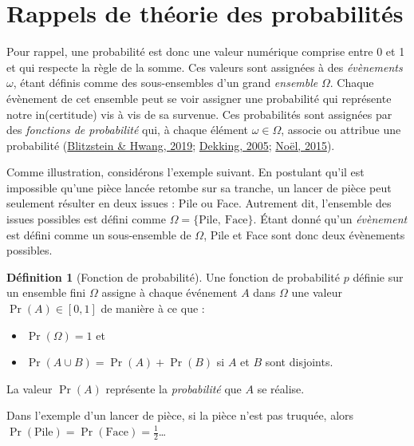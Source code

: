 \documentclass[
  a4paper,11pt,twoside,onecolumn,openright,final,oldfontcommands]{memoir}
\providecommand{\tightlist}{%
  \setlength{\itemsep}{0pt}\setlength{\parskip}{0pt}}
\theoremstyle{definition}
\newtheorem{definition}{Définition}[chapter]
\theoremstyle{definition}
\theoremstyle{definition}
\theoremstyle{definition}
\theoremstyle{remark}
\begin{document}
\hypertarget{rappels-de-thuxe9orie-des-probabilituxe9s}{%
\section{Rappels de théorie des probabilités}\label{rappels-de-thuxe9orie-des-probabilituxe9s}}

Pour rappel, une probabilité est donc une valeur numérique comprise entre 0 et 1 et qui respecte la règle de la somme. Ces valeurs sont assignées à des \emph{évènements} \(\omega\), étant définis comme des sous-ensembles d'un grand \emph{ensemble} \(\Omega\). Chaque évènement de cet ensemble peut se voir assigner une probabilité qui représente notre in(certitude) vis à vis de sa survenue. Ces probabilités sont assignées par des \emph{fonctions de probabilité} qui, à chaque élément \(\omega \in \Omega\), associe ou attribue une probabilité (\protect\hyperlink{ref-blitzstein_introduction_2019}{Blitzstein \& Hwang, 2019}; \protect\hyperlink{ref-dekking_modern_2005}{Dekking, 2005}; \protect\hyperlink{ref-noel_psychologie_2015}{Noël, 2015}).

Comme illustration, considérons l'exemple suivant. En postulant qu'il est impossible qu'une pièce lancée retombe sur sa tranche, un lancer de pièce peut seulement résulter en deux issues : Pile ou Face. Autrement dit, l'ensemble des issues possibles est défini comme \(\Omega = \{\text{Pile}, \ \text{Face}\}\). Étant donné qu'un \emph{évènement} est défini comme un sous-ensemble de \(\Omega\), Pile et Face sont donc deux évènements possibles.

\begin{definition}[Fonction de probabilité]
\protect\hypertarget{def:prob-function}{}\label{def:prob-function}Une fonction de probabilité \(p\) définie sur un ensemble fini \(\Omega\) assigne à chaque événement \(A\) dans \(\Omega\) une valeur \(\Pr(A) \in [0, 1]\) de manière à ce que :

\begin{itemize}
\tightlist
\item
  \(\Pr(\Omega) = 1\) et
\item
  \(\Pr(A \cup B) = \Pr(A) + \Pr(B)\) si \(A\) et \(B\) sont disjoints.
\end{itemize}

La valeur \(\Pr(A)\) représente la \emph{probabilité} que \(A\) se réalise.
\end{definition}

Dans l'exemple d'un lancer de pièce, si la pièce n'est pas truquée, alors \(\Pr(\text{Pile}) = \Pr(\text{Face}) = \frac{1}{2}\)\ldots{}
\end{document}
